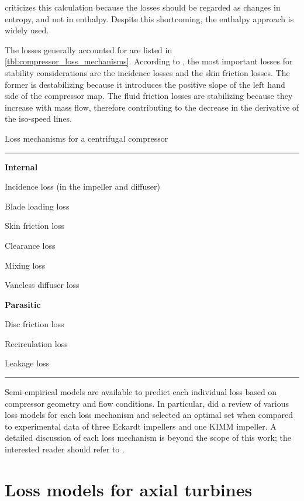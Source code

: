 \textcite{Aungier1995} criticizes this calculation because the losses should be regarded as changes in entropy, and not in enthalpy. Despite this shortcoming, the enthalpy approach is widely used.

The losses generally accounted for are listed in \cref{tbl:compressor_loss_mechanisms}. According to \textcite{Gravdahl2004,Gravdahl1999,Watson1982}, the most important losses for stability considerations are the incidence losses and the skin friction losses. The former is destabilizing because it introduces the positive slope of the left hand side of the compressor map. The fluid friction losses are stabilizing because they increase with mass flow, therefore contributing to the decrease in the derivative of the iso-speed lines.
\begin{table}
\caption{Loss mechanisms for a centrifugal compressor}
\label{tbl:compressor_loss_mechanisms}
\hrule
\begin{multicols}{2}
\begin{compactitem}
    \item[] \textbf{Internal}
    \item Incidence loss (in the impeller and diffuser)
    \item Blade loading loss
    \item Skin friction loss
    \item Clearance loss
    \item Mixing loss
    \item Vaneless diffuser loss
    \columnbreak
    \item[] \textbf{Parasitic}
    \item Disc friction loss
    \item Recirculation loss
    \item Leakage loss
\end{compactitem}
\end{multicols}
\hrule
{}
\end{table}

Semi-empirical models are available to predict each individual loss based on compressor geometry and flow conditions. 
In particular, \textcite{Oh1997} did a review of various loss models for each loss mechanism and selected an optimal set when compared to experimental data of three Eckardt impellers and one KIMM impeller.
A detailed discussion of each loss mechanism is beyond the scope of this work; 
the interested reader should refer to \textcite{Cumpsty2004}.

\section{Loss models for axial turbines}

